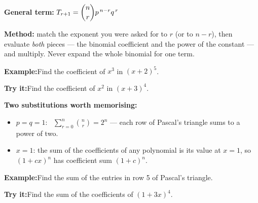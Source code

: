 \documentclass[12pt]{article}
\begin{document}

\begin{formulabox}
\textbf{General term:}\quad
$T_{r+1} = \dbinom{n}{r} p^{\,n-r} q^{\,r}$\par
\smallskip
\textbf{Method:} match the exponent you were asked for to $r$ (or to $n-r$),
then evaluate \emph{both} pieces --- the binomial coefficient and the power of
the constant --- and multiply. Never expand the whole binomial for one term.
\end{formulabox}

\begin{examplebox}
\textbf{Example:}\quad Find the coefficient of $x^{3}$ in $(x+2)^{5}$.
\end{examplebox}

\begin{tryitbox}
\textbf{Try it:}\quad Find the coefficient of $x^{2}$ in $(x+3)^{4}$.\\[2pt]
\end{tryitbox}


\begin{formulabox}
\textbf{Two substitutions worth memorising:}\par
\smallskip
\begin{itemize}[leftmargin=1.2cm, itemsep=1pt, topsep=2pt]
  \item $p = q = 1$: \ $\displaystyle\sum_{r=0}^{n}\binom{n}{r} = 2^{n}$ ---
        each row of Pascal's triangle sums to a power of two.
  \item $x = 1$: the sum of the coefficients of any polynomial is its value at
        $x = 1$, so $(1+cx)^{n}$ has coefficient sum $(1+c)^{n}$.
\end{itemize}
\end{formulabox}

\begin{examplebox}
\textbf{Example:}\quad Find the sum of the entries in row 5 of Pascal's
triangle.
\end{examplebox}

\begin{tryitbox}
\textbf{Try it:}\quad Find the sum of the coefficients of $(1+3x)^{4}$.\\[2pt]
\end{tryitbox}
\end{document}
